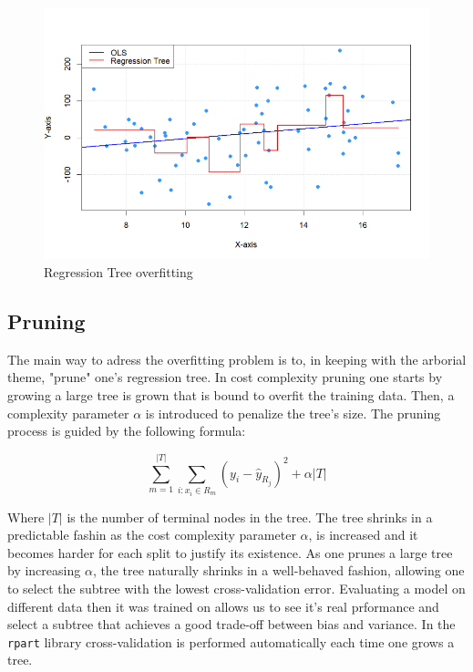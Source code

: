 \documentclass[12pt]{article}
\begin{document}
\begin{figure}
    \centering
    \includegraphics[scale=0.50]{image.png}
    \caption{Regression Tree overfitting}
    \label{overfitting_tree}
\end{figure}


\subsection{Pruning}

The main way to adress the overfitting problem is to, in keeping with the arborial theme, "prune" one's regression tree. In cost complexity pruning one starts by growing a large tree is grown that is bound to overfit the training data. Then, a complexity parameter $\alpha$ is introduced to penalize the tree's size. The pruning process is guided by the following formula:

\begin{equation}
    \sum_{m=1}^{|T|} \sum_{i: x_i \in R_m} (y_i - \hat{y}_{R_j})^2 + \alpha|T|
\end{equation}

Where $|T|$ is the number of terminal nodes in the tree. The tree shrinks in a predictable fashin as the cost complexity parameter $\alpha$, is increased and it becomes harder for each split to justify its existence. As one prunes a large tree by increasing $\alpha$, the tree naturally shrinks in a well-behaved fashion, allowing one to select the subtree with the lowest cross-validation error. Evaluating a model on different data then it was trained on allows us to see it's real prformance and select a subtree that achieves a good trade-off between bias and variance. In the \texttt{rpart} library cross-validation is performed automatically each time one grows a tree.
\end{document}
